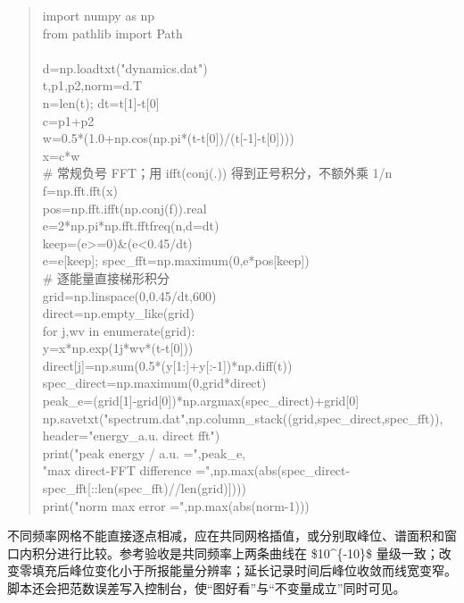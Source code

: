 \documentclass[UTF8,openany,11pt,fontset=fandol]{ctexbook}
\begin{document}
\begin{quote}
import numpy as np\\
from pathlib import Path\\
~\\
d=np.loadtxt("dynamics.dat")\\
t,p1,p2,norm=d.T\\
n=len(t); dt=t{[}1{]}-t{[}0{]}\\
c=p1+p2\\
w=0.5*(1.0+np.cos(np.pi*(t-t{[}0{]})/(t{[}-1{]}-t{[}0{]})))\\
x=c*w\\
\# 常规负号 FFT；用 ifft(conj(.)) 得到正号积分，不额外乘 1/n\\
f=np.fft.fft(x)\\
pos=np.fft.ifft(np.conj(f)).real\\
e=2*np.pi*np.fft.fftfreq(n,d=dt)\\
keep=(e\textgreater=0)\&(e\textless0.45/dt)\\
e=e{[}keep{]}; spec\_fft=np.maximum(0,e*pos{[}keep{]})\\
\# 逐能量直接梯形积分\\
grid=np.linspace(0,0.45/dt,600)\\
direct=np.empty\_like(grid)\\
for j,wv in enumerate(grid):\\
y=x*np.exp(1j*wv*(t-t{[}0{]}))\\
direct{[}j{]}=np.sum(0.5*(y{[}1:{]}+y{[}:-1{]})*np.diff(t))\\
spec\_direct=np.maximum(0,grid*direct)\\
peak\_e=(grid{[}1{]}-grid{[}0{]})*np.argmax(spec\_direct)+grid{[}0{]}\\
np.savetxt("spectrum.dat",np.column\_stack((grid,spec\_direct,spec\_fft)),\\
header="energy\_a.u. direct fft")\\
print("peak energy / a.u. =",peak\_e,\\
"max direct-FFT difference
=",np.max(abs(spec\_direct-spec\_fft{[}::len(spec\_fft)//len(grid){]})))\\
print("norm max error =",np.max(abs(norm-1)))
\end{quote}

不同频率网格不能直接逐点相减，应在共同网格插值，或分别取峰位、谱面积和窗口内积分进行比较。参考验收是共同频率上两条曲线在
\$10\^{}\{-10\}\$
量级一致；改变零填充后峰位变化小于所报能量分辨率；延长记录时间后峰位收敛而线宽变窄。脚本还会把范数误差写入控制台，使``图好看''与``不变量成立''同时可见。
\end{document}

